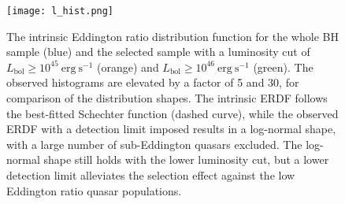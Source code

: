 \documentclass[twocolumn, twocolappendix]{aastex63}
\newcommand{\Lbol}{L_\mathrm{bol}}
\begin{document}
\begin{CJK*}{UTF8}{gbsn}
\begin{figure}
\centering
\texttt{[image: l\_hist.png]}
\caption{
The intrinsic Eddington ratio distribution function for the whole BH sample (blue) and the selected sample with
a luminosity cut of $\Lbol \geq 10^{45}~\mathrm{erg~s^{-1}}$ (orange) and $\Lbol \geq 10^{46}~\mathrm{erg~s^{-1}}$ (green).  
The observed histograms are elevated by a factor of 5 and 30, for comparison of the distribution shapes.
The intrinsic ERDF follows the best-fitted Schechter function (dashed curve), 
while the observed ERDF with a detection limit imposed results in a log-normal shape, 
with a large number of sub-Eddington quasars excluded.
The log-normal shape still holds with the lower luminosity cut, 
but a lower detection limit alleviates the selection effect against the low Eddington ratio quasar populations.
}
\label{fig:lhist}
\end{figure}
  



\end{CJK*}
\end{document}
